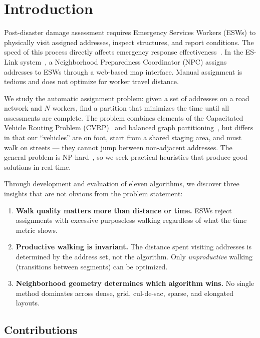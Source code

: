 \documentclass[conference]{IEEEtran}
\begin{document}
\section{Introduction}

Post-disaster damage assessment requires Emergency Services Workers (ESWs) to physically visit assigned addresses, inspect structures, and report conditions. The speed of this process directly affects emergency response effectiveness~\cite{fema2023}. In the ES-Link system~\cite{eslink}, a Neighborhood Preparedness Coordinator (NPC) assigns addresses to ESWs through a web-based map interface. Manual assignment is tedious and does not optimize for worker travel distance.

We study the automatic assignment problem: given a set of addresses on a road network and $N$ workers, find a partition that minimizes the time until all assessments are complete. The problem combines elements of the Capacitated Vehicle Routing Problem (CVRP)~\cite{toth2014} and balanced graph partitioning~\cite{andreev2006}, but differs in that our ``vehicles'' are on foot, start from a shared staging area, and must walk on streets --- they cannot jump between non-adjacent addresses. The general problem is NP-hard~\cite{garey1979}, so we seek practical heuristics that produce good solutions in real-time.

Through development and evaluation of eleven algorithms, we discover three insights that are not obvious from the problem statement:

\begin{enumerate}
\item \textbf{Walk quality matters more than distance or time.} ESWs reject assignments with excessive purposeless walking regardless of what the time metric shows.
\item \textbf{Productive walking is invariant.} The distance spent visiting addresses is determined by the address set, not the algorithm. Only \emph{unproductive} walking (transitions between segments) can be optimized.
\item \textbf{Neighborhood geometry determines which algorithm wins.} No single method dominates across dense, grid, cul-de-sac, sparse, and elongated layouts.
\end{enumerate}

\subsection{Contributions}
\end{document}
